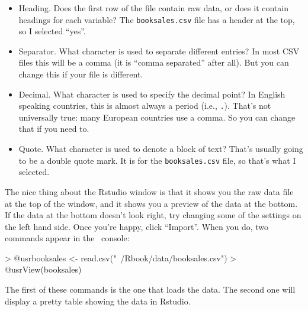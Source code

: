 \begin{itemize}
\item Heading. Does the first row of the file contain raw data, or does it contain headings for each variable? The \texttt{booksales.csv} file has a header at the top, so I selected ``yes''.
\item Separator. What character is used to separate different entries? In most CSV files this will be a comma (it is ``comma separated'' after all). But you can change this if your file is different. 
\item Decimal. What character is used to specify the decimal point? In English speaking countries, this is almost always a period (i.e., \texttt{.}). That's not universally true: many European countries use a comma. So you can change that if you need to.
\item Quote. What character is used to denote a block of text? That's usually going to be a double quote mark. It is for the \texttt{booksales.csv} file, so that's what I selected.
\end{itemize}
The nice thing about the Rstudio window is that it shows you the raw data file at the top of the window, and it shows you a preview of the data at the bottom. If the data at the bottom doesn't look right, try changing some of the settings on the left hand side. Once you're happy, click ``Import''. When you do, two commands appear in the \R\ console:
\begin{rblock1}
> @usr{booksales <- read.csv("~/Rbook/data/booksales.csv")}
> @usr{View(booksales)}
\end{rblock1}
The first of these commands is the one that loads the data. The second one will display a pretty table showing the data in Rstudio. 



